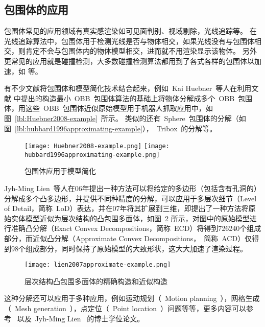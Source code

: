 \subsection{包围体的应用}
\label{subsec:bv:application}

包围体常见的应用领域有真实感渲染如可见面判别、视域剔除\cite{assarsson2000optimized}，光线追踪\cite{wald2007ray}等。
在光线追踪算法中，包围体用于检测光线是否与物体相交，如果光线没有与包围体相交，则肯定不会与包围体内的物体模型相交，进而就不用渲染显示该物体。
另外更常见的应用就是碰撞检测\cite{wangzhiqiang1999}，大多数碰撞检测算法都用到了各式各样的包围体以加速，如
 等。

有不少文献将包围体和模型简化技术结合起来，例如~Kai Huebner~等人\cite{huebner2008minimum}在利用文献
中提出的构造最小~OBB~包围体算法的基础上将物体分解成多个~OBB~包围体，用这些~OBB~包围体近似原始模型用于机器人抓取应用中，如图~\ref{lbl:Huebner2008-example}~所示。
类似的还有~Sphere~包围体的分解\cite{hubbard1996approximating}（如图~\ref{lbl:hubbard1996approximating-example}），~Tribox~的分解\cite{crosnier1999tribox}等。
\begin{figure}[htbp]
  \centering
    {\texttt{[image: Huebner2008-example.png]}}
    {\texttt{[image: hubbard1996approximating-example.png]}}
  \caption{包围体应用于模型简化}
  \label{lbl:bounding-voluems-used-in-shape-approximation}
\end{figure}
Jyh-Ming Lien~\cite{lien2006approximate2d}等人在06年提出一种方法可以将给定的多边形（包括含有孔洞的）分解成多个凸多边形，并提供不同种精度的分解，可以应用于多层次细节（Level of
Detail，简称~LoD）表达，并在07年将其扩展到三维\cite{lien2007approximate3d}，即提出了一种方法将原始实体模型近似为层次结构的凸包围多面体，如图~\ref{lbl:lien2007approximate-example}
所示，对图中的原始模型进行准确凸分解（Exact Convex
Decompositions，简称~ECD）将得到726240个组成部分，而近似凸分解（Approximate Convex
Decompositions，~简称~ACD）仅得到98个组成部分，同时保持了原始模型的大致形状，这大大加速了渲染过程。
\begin{figure}[htbp]
\centering
\texttt{[image: lien2007approximate-example.png]}
\caption{层次结构凸包围多面体的精确构造和近似构造\cite{lien2007approximate3d}}
\label{lbl:lien2007approximate-example}
\end{figure}
这种分解还可以应用于多种应用，例如运动规划（~Motion planning~），网格生成（~Mesh generation~），点定位（~Point location~）问题等等，更多内容可以参考~ 以及~Jyh-Ming Lien~ 的博士学位论文\cite{lien2006approximatephd}。

